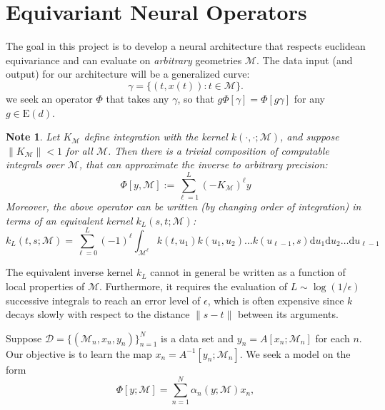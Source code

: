 \documentclass{article}
\newtheorem{note}{Note}
\newcommand{\manifold}{\mathcal{M}}
\newcommand{\dif}[1]{\mathrm{d}#1}
\newcommand{\euclid}[1]{\mathrm{E}(#1)}
\newcommand{\data}{\mathcal{D}}
\begin{document}
    
    \section{Equivariant Neural Operators}
    The goal in this project is to develop a neural architecture that respects euclidean equivariance and can evaluate on \emph{arbitrary} geometries $\manifold$. The data input (and output) for our architecture will be a generalized curve:
    \[
        \gamma = \{(t, x(t))\colon t\in\manifold\}.
    \] 
    we seek an operator $\Phi$ that takes any $\gamma$, so that $g\Phi[\gamma] = \Phi[g\gamma]$ for any $g\in \euclid{d}$. 
    \begin{note}
        Let $K_\manifold$ define integration with the kernel $k(\cdot,\cdot;\manifold)$, and suppose $\|K_\manifold\|<1$ for all $\manifold$. Then there is a trivial composition of computable integrals over $\manifold$, that can approximate the inverse to arbitrary precision:
        \[
            \Phi[y, \manifold] := \sum_{\ell=1}^L (-K_\manifold)^\ell y
        \]
        Moreover, the above operator can be written (by changing order of integration) in terms of an equivalent kernel $k_L(s,t;\manifold)$: 
        \[
            k_L(t,s; \manifold) = \sum_{\ell=0}^L (-1)^\ell\int_{\manifold^\ell}k(t,u_1)k(u_1,u_2)\dots k(u_{\ell-1},s)\dif{u_1}\dif{u_2}\dots\dif{u_{\ell-1}}
        \]
    \end{note}
    The equivalent inverse kernel $k_L$ cannot in general be written as a function of local properties of $\manifold$. Furthermore, it requires the evaluation of $L\sim \log(1/\epsilon)$ successive integrals to reach an error level of $\epsilon$, which is often expensive since $k$ decays slowly with respect to the distance $\|s-t\|$ between its arguments.
    
    Suppose $\data = \{(\manifold_n, x_n, y_n)\}_{n=1}^N$ is a data set and $y_n = A[x_n; \manifold_n]$ for each $n$. Our objective is to learn the map $x_n = A^{-1}[y_n; \manifold_n]$. We seek a model on the form 
    \[
        \Phi[y;\manifold] = \sum_{n=1}^{N}\alpha_n(y;\manifold)x_n, 
    \]
\end{document}
